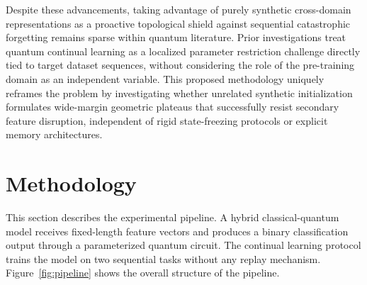 \documentclass[conference]{IEEEtran}
\begin{document}
Despite these advancements, taking advantage of purely synthetic cross-domain representations as a proactive topological shield against sequential catastrophic forgetting remains sparse within quantum literature. Prior investigations treat quantum continual learning as a localized parameter restriction challenge directly tied to target dataset sequences, without considering the role of the pre-training domain as an independent variable. This proposed methodology uniquely reframes the problem by investigating whether unrelated synthetic initialization formulates wide-margin geometric plateaus that successfully resist secondary feature disruption, independent of rigid state-freezing protocols or explicit memory architectures.


\section{Methodology}\label{sec:methodology}

This section describes the experimental pipeline. A hybrid classical-quantum model receives fixed-length feature vectors and produces a binary classification output through a parameterized quantum circuit. The continual learning protocol trains the model on two sequential tasks without any replay mechanism. Figure~\ref{fig:pipeline} shows the overall structure of the pipeline.
\end{document}

